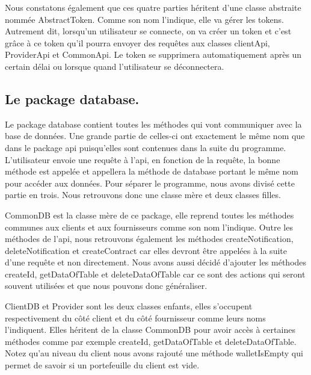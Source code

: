 \begin{flushleft}
Nous constatons également que ces quatre parties héritent d'une classe abstraite nommée AbstractToken. Comme son nom l'indique, elle va gérer les tokens. Autrement dit, lorsqu'un utilisateur se connecte, on va créer un token et c'est grâce à ce token qu'il pourra envoyer des requêtes aux classes clientApi, ProviderApi et CommonApi. Le token se supprimera automatiquement après un certain délai ou lorsque quand l'utilisateur se déconnectera.
\end{flushleft}

\subsection{Le package database.}

\begin{flushleft}
Le package database contient toutes les méthodes qui vont communiquer avec la base de données. Une grande partie de celles-ci ont exactement le même nom que dans le package api puisqu’elles sont contenues dans la suite du programme. L'utilisateur envoie une requête à l'api, en fonction de la requête, la bonne méthode est appelée et appellera la méthode de database portant le même nom pour accéder aux données. Pour séparer le programme, nous avons divisé  cette partie en trois. Nous retrouvons donc une classe mère et deux classes filles.
\end{flushleft}

\begin{flushleft}
CommonDB est la classe mère de ce package, elle reprend toutes les méthodes communes aux clients et aux fournisseurs comme son nom l'indique. Outre les méthodes de l'api, nous retrouvons également les méthodes createNotification, deleteNotification et createContract car elles devront être appelées à la suite d'une requête et non directement. Nous avons aussi décidé d'ajouter les méthodes createId, getDataOfTable et deleteDataOfTable car ce sont des actions qui seront souvent utilisées et que nous pouvons donc généraliser.
\end{flushleft}

\begin{flushleft}
ClientDB et Provider sont les deux classes enfants, elles s'occupent respectivement du côté client et du côté fournisseur comme leurs noms l'indiquent. Elles héritent de la classe CommonDB pour avoir accès à certaines méthodes comme par exemple createId, getDataOfTable et deleteDataOfTable. Notez qu'au niveau du client nous avons rajouté une méthode walletIsEmpty qui permet de savoir si un portefeuille du client est vide.
\end{flushleft}

